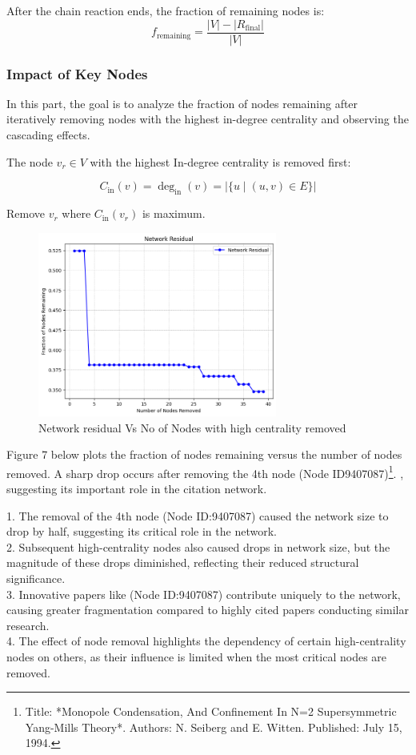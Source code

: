 \documentclass{article}
\begin{document}
After the chain reaction ends, the fraction of remaining nodes is:
\[
f_{\text{remaining}} = \frac{|V| - |R_{\text{final}}|}{|V|}
\]

\subsubsection{Impact of Key Nodes }
In this part, the goal is to analyze the fraction of nodes remaining after iteratively removing nodes with the highest in-degree centrality and observing the cascading effects.

The node \( v_r \in V \) with the highest In-degree centrality is removed first:

\[
C_{\text{in}}(v) = \deg_{\text{in}}(v) = \left| \{ u \mid (u, v) \in E \} \right|
\]

Remove \( v_r \) where \( C_{\text{in}}(v_r) \) is maximum.

\begin{figure}[h]
\begin{center}
\includegraphics[width=0.7\textwidth]{Figures/Network Residual.png}
\end{center}
\caption{Network residual Vs No of Nodes with high centrality removed}
\end{figure}

Figure 7 below plots the fraction of nodes remaining versus the number of nodes removed. A sharp drop occurs after removing the 4th node (Node ID9407087)\footnote{Title: *Monopole Condensation, And Confinement In N=2 Supersymmetric Yang-Mills Theory*. Authors: N. Seiberg and E. Witten. Published: July 15, 1994.}.
, suggesting its important role in the citation network.

1.	The removal of the 4th node (Node ID:9407087) caused the network size to drop by half, suggesting its critical role in the network.\\
2.	Subsequent high-centrality nodes also caused drops in network size, but the magnitude of these drops diminished, reflecting their reduced structural significance.\\
3.	Innovative papers like (Node ID:9407087) contribute uniquely to the network, causing greater fragmentation compared to highly cited papers conducting similar research.\\
4.	The effect of node removal highlights the dependency of certain high-centrality nodes on others, as their influence is limited when the most critical nodes are removed.
\end{document}
